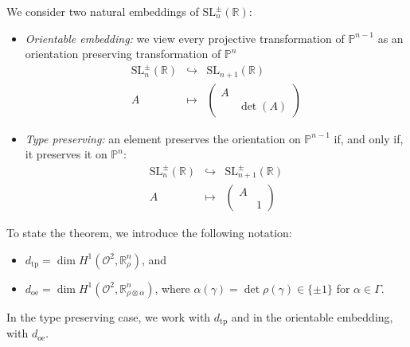 \documentclass[a4paper,11pt]{article}
\begin{document}
 



We consider two natural embeddings of $\mathrm{SL}^{\pm }_n (\mathbb R)$:
\begin{itemize}
 \item \emph{Orientable embedding:} we view every projective transformation of $\mathbb P^{n-1}$ as an orientation preserving transformation of $\mathbb P ^n$
 $$
 \begin{array}{rcl}
  \mathrm{SL}^{\pm }_n (\mathbb R)& \hookrightarrow &  
  \mathrm{SL}_{n+1}(\mathbb R) \\
  A & \mapsto & \begin{pmatrix}
                A & \\ & \det(A)
                \end{pmatrix}
 \end{array}
 $$
 \item \emph{Type preserving:} an element preserves the orientation on   $\mathbb P^{n-1}$ if, and only if, it preserves it on  $\mathbb P^{n}$:
 $$
 \begin{array}{rcl}
  \mathrm{SL}^{\pm }_n (\mathbb R)& \hookrightarrow &  
  \mathrm{SL}^{\pm}_{n+1} (\mathbb R) \\
  A & \mapsto & \begin{pmatrix}
                 A & \\ & 1
                \end{pmatrix}
 \end{array}
 $$
\end{itemize}
To state the theorem, we introduce the following notation:
\begin{itemize}
 \item $d_{\mathrm{tp}}=\dim H^1(\mathcal O^2,\mathbb R^n_\rho)$, and
 \item   $d_{\mathrm{oe}}=\dim H^1(\mathcal O^2,\mathbb R^n_{\rho\otimes \alpha})$,
where $\alpha(\gamma)=\det\rho(\gamma)\in\{\pm 1\}$ for $\alpha\in\Gamma$.
\end{itemize}
In the type preserving case, we work with $d_{\mathrm{tp}}$ 
and in the orientable embedding, with  $d_{\mathrm{oe}}$.
 
\end{document}
